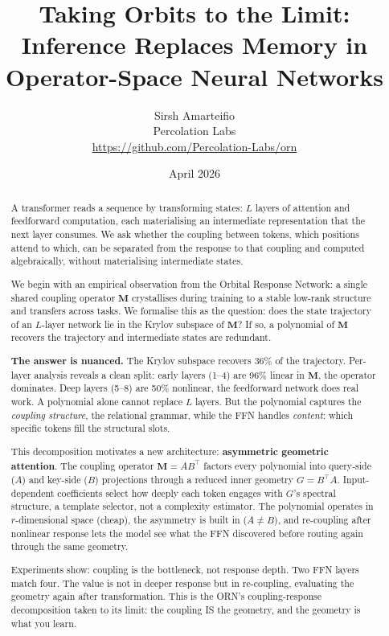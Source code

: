 \documentclass[11pt, a4paper]{article}
\title{%
    \textbf{Taking Orbits to the Limit:}\\[4pt]
    \Large Inference Replaces Memory in Operator-Space Neural Networks%
}
\author{%
    Sirsh Amarteifio\\
    {\small Percolation Labs}\\
    {\small \url{https://github.com/Percolation-Labs/orn}}%
}
\date{April 2026 \quad{\small\textnormal{,  Working Draft}}}
\newcommand{\M}{\mathbf{M}}
\theoremstyle{plain}
\theoremstyle{definition}
\theoremstyle{remark}
\begin{document}
\maketitle

\begin{abstract}
A transformer reads a sequence by transforming states: $L$ layers of attention and feedforward computation, each materialising an intermediate representation that the next layer consumes.
We ask whether the coupling between tokens, which positions attend to which, can be separated from the response to that coupling and computed algebraically, without materialising intermediate states.

We begin with an empirical observation from the Orbital Response Network: a single shared coupling operator $\M$ crystallises during training to a stable low-rank structure and transfers across tasks.
We formalise this as the question: does the state trajectory of an $L$-layer network lie in the Krylov subspace of $\M$?
If so, a polynomial of $\M$ recovers the trajectory and intermediate states are redundant.

\textbf{The answer is nuanced.}
The Krylov subspace recovers 36\% of the trajectory.
Per-layer analysis reveals a clean split: early layers (1--4) are 96\% linear in $\M$, the operator dominates.
Deep layers (5--8) are 50\% nonlinear, the feedforward network does real work.
A polynomial alone cannot replace $L$ layers.
But the polynomial captures the \emph{coupling structure}, the relational grammar, while the FFN handles \emph{content}: which specific tokens fill the structural slots.

This decomposition motivates a new architecture: \textbf{asymmetric geometric attention}.
The coupling operator $\M = AB^\top$ factors every polynomial into query-side ($A$) and key-side ($B$) projections through a reduced inner geometry $G = B^\top A$.
Input-dependent coefficients select how deeply each token engages with $G$'s spectral structure, a template selector, not a complexity estimator.
The polynomial operates in $r$-dimensional space (cheap), the asymmetry is built in ($A \neq B$), and re-coupling after nonlinear response lets the model see what the FFN discovered before routing again through the same geometry.

Experiments show: coupling is the bottleneck, not response depth.
Two FFN layers match four.
The value is not in deeper response but in re-coupling, evaluating the geometry again after transformation.
This is the ORN's coupling-response decomposition taken to its limit: the coupling IS the geometry, and the geometry is what you learn.
\end{abstract}
\end{document}
